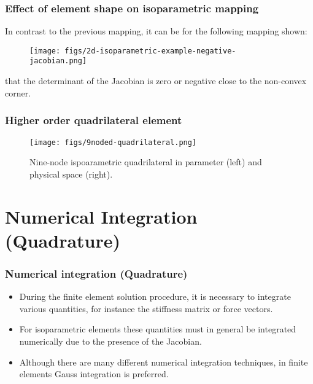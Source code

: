 \documentclass[notes]{beamer}
\begin{document}
\begin{frame}
\frametitle{Effect of element shape on isoparametric mapping}
In contrast to the previous mapping, it can be for the following mapping shown:
\begin{figure}[ht]
	\centering
	\texttt{[image: figs/2d-isoparametric-example-negative-jacobian.png]}
\end{figure}
that the determinant of the Jacobian is zero or negative close to the non-convex corner.
\end{frame}


\begin{frame}
	\frametitle{Higher order quadrilateral element}
	
	\begin{figure}[ht]
		\centering
		\texttt{[image: figs/9noded-quadrilateral.png]}
		\caption*{Nine-node ispoarametric quadrilateral in parameter (left) and physical space (right).}
	\end{figure}
\end{frame}


\section{Numerical Integration (Quadrature)}
\begin{frame}
\frametitle{Numerical integration (Quadrature)}
\begin{itemize}
	\item During the finite element solution procedure, it is necessary to integrate various quantities,	for instance the stiffness matrix or force vectors. 
	\item For isoparametric elements these
	quantities must in general be integrated numerically due to the presence of the Jacobian.
	\item Although there are many different numerical integration techniques, in finite elements
	Gauss integration is preferred.
\end{itemize}
\end{frame}
\end{document}
